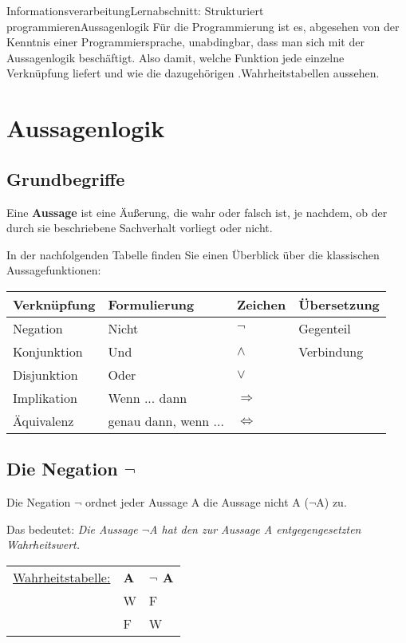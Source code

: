 \documentclass[11pt,oneside,openany,headings=optiontotoc,11pt,numbers=noenddot]{article}
\begin{document}
	\begin{worksheet}{Informationsverarbeitung}{Lernabschnitt: Strukturiert programmieren}{Aussagenlogik}
		\noindent
		\setcounter{section}{1}
		\setcounter{page}{3}
		\noindent
		Für die Programmierung ist es, abgesehen von der Kenntnis einer Programmiersprache, unabdingbar, dass man sich mit der Aussagenlogik beschäftigt. Also damit, welche Funktion jede einzelne Verknüpfung liefert und wie die dazugehörigen \grqq.{}Wahrheitstabellen\grqq{} aussehen.
		\section{Aussagenlogik}
		\subsection{Grundbegriffe}
		Eine \textbf{Aussage} ist eine Äußerung, die wahr oder falsch ist, je nachdem, ob der durch sie beschriebene Sachverhalt vorliegt oder nicht.\\
		\par\noindent
		In der nachfolgenden Tabelle finden Sie einen Überblick über die klassischen Aussagefunktionen:\\
		\par\noindent
		\begin{tabularx}{\textwidth}{|X|X|X|X|}
			\hline
			\rowcolor{gray!10} \textbf{Verknüpfung} & \textbf{Formulierung} & \textbf{Zeichen} & \textbf{\glqq{}Übersetzung\grqq{}}\\
			\hline
			Negation & Nicht & \(\neg\) & Gegenteil\\
			\hline
			Konjunktion & Und & \(\wedge\) & Verbindung\\
			\hline
			Disjunktion & Oder & \(\vee\) & \\
			\hline
			Implikation & Wenn ... dann & \(\Rightarrow\) & \\
			\hline
			Äquivalenz & genau dann, wenn ... & \(\Leftrightarrow\) & \\
			\hline
		\end{tabularx}
		\subsection{Die Negation \grqq{}\(\neg\)\grqq{}}
		Die Negation \grqq{}$\neg$\grqq{} ordnet jeder Aussage A die Aussage \grqq{}nicht A\grqq{} ($\neg$A) zu.
		\begin{framed}
			\noindent
			Das bedeutet: \textit{Die Aussage $\neg$A hat den zur Aussage A entgegengesetzten Wahrheitswert.}
		\end{framed}
		\par\noindent
		\begin{tabularx}{\textwidth}{l|l|l|}
			\cline{2-3}
			\underline{Wahrheitstabelle:} & \textbf{A} & \textbf{$\mathbf{\neg}$ A}\\
			\cline{2-3}
			& W & F\\
			\cline{2-3}
			& F & W\\
			\cline{2-3}
		\end{tabularx}

\end{worksheet}
\end{document}
